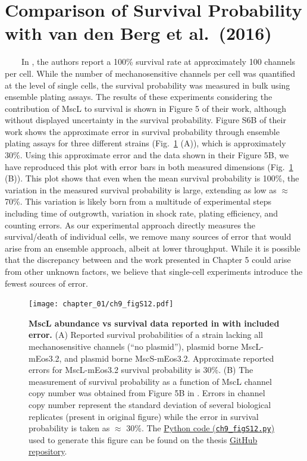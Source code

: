 \documentclass[12pt]{caltech_thesis}
\begin{document}
\hypertarget{comparison-of-survival-probability-with-van-den-berg-et-al.-2016}{%
\section{Comparison of Survival Probability with van den Berg et
al.~(2016)}\label{comparison-of-survival-probability-with-van-den-berg-et-al.-2016}}

~~~~In \textcite{vandenberg2016}, the authors report a 100\% survival
rate at approximately 100 channels per cell. While the number of
mechanosensitive channels per cell was quantified at the level of single
cells, the survival probability was measured in bulk using ensemble
plating assays. The results of these experiments considering the
contribution of MscL to survival is shown in Figure 5 of their work,
although without displayed uncertainty in the survival probability.
Figure S6B of their work shows the approximate error in survival
probability through ensemble plating assays for three different strains
(Fig.~\ref{fig:poolman_comparison} (A)), which is approximately 30\%.
Using this approximate error and the data shown in their Figure 5B, we
have reproduced this plot with error bars in both measured dimensions
(Fig.~\ref{fig:poolman_comparison} (B)). This plot shows that even when
the mean survival probability is 100\%, the variation in the measured
survival probability is large, extending as low as \(\approx\) 70\%.
This variation is likely born from a multitude of experimental steps
including time of outgrowth, variation in shock rate, plating
efficiency, and counting errors. As our experimental approach directly
measures the survival/death of individual cells, we remove many sources
of error that would arise from an ensemble approach, albeit at lower
throughput. While it is possible that the discrepancy between
\textcite{vandenberg2016} and the work presented in Chapter 5 could
arise from other unknown factors, we believe that single-cell
experiments introduce the fewest sources of error.

\hypertarget{fig:poolman_comparison}{%
\begin{figure}
\centering
\texttt{[image: chapter\_01/ch9\_figS12.pdf]}
\caption[{MscL abundance versus survival data reported in van den Berg
et al. 2016 with included error.}]{\textbf{MscL abundance vs survival
data reported in \textcite{vandenberg2016} with included error.} (A)
Reported survival probabilities of a strain lacking all mechanosensitive
channels (``no plasmid''), plasmid borne MscL-mEos3.2, and plasmid borne
MscS-mEos3.2. Approximate reported errors for MscL-mEos3.2 survival
probability is 30\%. (B) The measurement of survival probability as a
function of MscL channel copy number was obtained from Figure 5B in
\textcite{vandenberg2016}. Errors in channel copy number represent the
standard deviation of several biological replicates (present in original
figure) while the error in survival probability is taken as \(\approx\)
30\%. The
\href{https://github.com/gchure/phd/blob/master/src/chapter_09/code/ch9_figS12.py}{Python
code (\texttt{ch9\_figS12.py})} used to generate this figure can be
found on the thesis \href{https://github.com/gchure/phd}{GitHub
repository}.}
\label{fig:poolman_comparison}
\end{figure}
}
\end{document}
